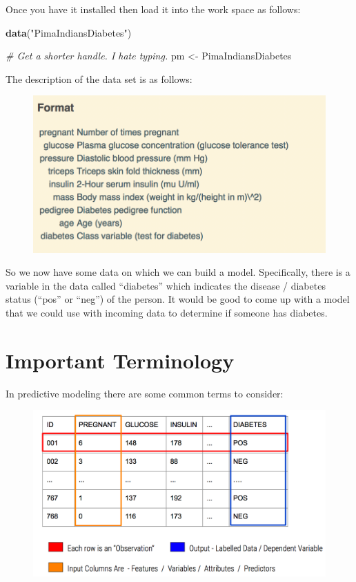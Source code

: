 \documentclass[]{book}
\newenvironment{Shaded}{\begin{snugshade}}{\end{snugshade}}
\newcommand{\KeywordTok}[1]{\textcolor[rgb]{0.13,0.29,0.53}{\textbf{#1}}}
\newcommand{\StringTok}[1]{\textcolor[rgb]{0.31,0.60,0.02}{#1}}
\newcommand{\CommentTok}[1]{\textcolor[rgb]{0.56,0.35,0.01}{\textit{#1}}}
\newcommand{\NormalTok}[1]{#1}
\begin{document}
Once you have it installed then load it into the work space as follows:

\begin{Shaded}
\begin{Highlighting}[]
\KeywordTok{data}\NormalTok{(}\StringTok{"PimaIndiansDiabetes"}\NormalTok{)}

\CommentTok{# Get a shorter handle. I hate typing. }
\NormalTok{pm <-}\StringTok{ }\NormalTok{PimaIndiansDiabetes}
\end{Highlighting}
\end{Shaded}

The description of the data set is as follows:

\begin{figure}
\centering
\includegraphics[width=4.94792in]{./PICS/pima_desc.png}
\caption{}
\end{figure}

So we now have some data on which we can build a model. Specifically,
there is a variable in the data called ``diabetes'' which indicates the
disease / diabetes status (``pos'' or ``neg'') of the person. It would
be good to come up with a model that we could use with incoming data to
determine if someone has diabetes.

\section{Important Terminology}\label{important-terminology}

In predictive modeling there are some common terms to consider:

\begin{figure}
\centering
\includegraphics[width=4.94792in]{./PICS/features2.png}
\caption{}
\end{figure}
\end{document}
